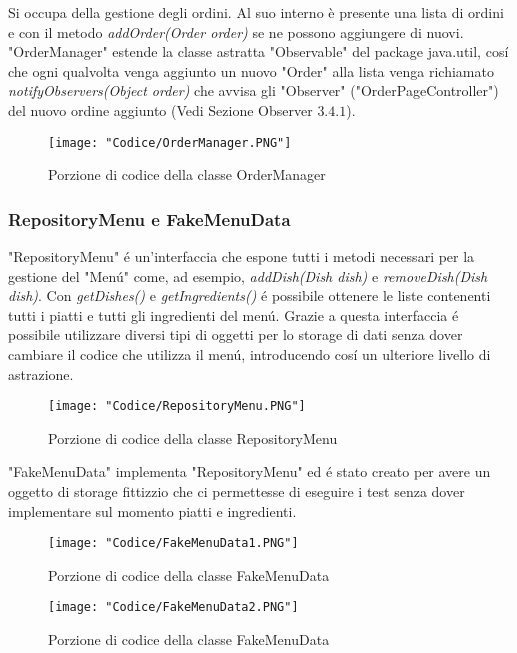 \documentclass{article}
\begin{document}
Si occupa della gestione degli ordini. Al suo interno è presente una lista di ordini e con il metodo \textit{addOrder(Order order)} se ne possono aggiungere di nuovi. "OrderManager" estende la classe astratta "Observable" del package java.util, cos\'i che ogni qualvolta venga aggiunto un nuovo "Order" alla lista venga richiamato \textit{notifyObservers(Object order)} che avvisa gli "Observer" ("OrderPageController") del nuovo ordine aggiunto (Vedi Sezione Observer $3.4.1 $). 


\begin{figure}[!h]
\centering
\texttt{[image: "Codice/OrderManager.PNG"]}
\caption{Porzione di codice della classe OrderManager}
\end{figure}

\subsubsection{RepositoryMenu e FakeMenuData}

"RepositoryMenu" \'e un'interfaccia che espone tutti i metodi necessari per la gestione del "Men\'u" come, ad esempio, \textit{addDish(Dish dish)} e \textit{removeDish(Dish dish)}. Con \textit{getDishes()} e \textit{getIngredients()} \'e possibile ottenere le liste contenenti tutti i piatti e tutti gli ingredienti del men\'u. Grazie a questa interfaccia \'e possibile utilizzare diversi tipi di oggetti per lo storage di dati senza dover cambiare il codice che utilizza il men\'u, introducendo cos\'i un ulteriore livello di astrazione.


\begin{figure}[!h]
\centering
\texttt{[image: "Codice/RepositoryMenu.PNG"]}
\caption{Porzione di codice della classe RepositoryMenu}
\end{figure}

\newpage

\noindent "FakeMenuData" implementa "RepositoryMenu" ed \'e stato creato per avere un oggetto di storage fittizzio che ci permettesse di eseguire i test senza dover implementare sul momento piatti e ingredienti.

\begin{figure}[!h]
\centering
\texttt{[image: "Codice/FakeMenuData1.PNG"]}
\caption{Porzione di codice della classe FakeMenuData}
\end{figure}

\begin{figure}[!h]
\centering
\texttt{[image: "Codice/FakeMenuData2.PNG"]}
\caption{Porzione di codice della classe FakeMenuData}
\end{figure}
\end{document}
